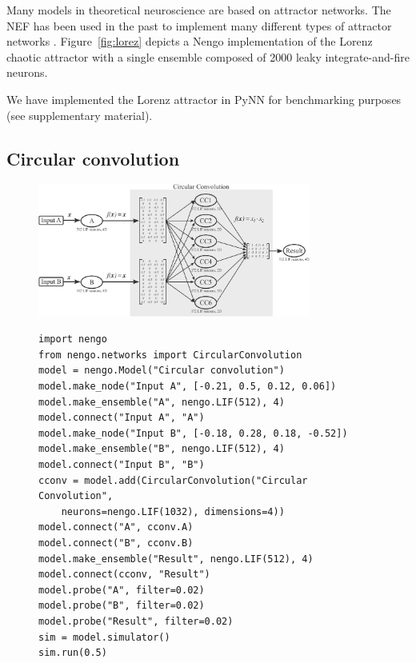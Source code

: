 \documentclass{frontiersSCNS}
\begin{document}
Many models in theoretical neuroscience
are based on attractor networks.
The NEF has been used in the past
to implement many different types of
attractor networks \cite{TODO}.
Figure~\ref{fig:lorez} depicts
a Nengo implementation of the Lorenz chaotic attractor
with a single ensemble
composed of 2000 leaky integrate-and-fire neurons.

We have implemented the Lorenz attractor
in PyNN for benchmarking purposes
(see supplementary material).

\subsection{Circular convolution} \label{sec:cconv}

\begin{figure}
\begin{center}
  \includegraphics[width=0.8\textwidth]{cconv}
  \begin{minipage}{0.46\textwidth}
    \begin{lstlisting}[basicstyle={\footnotesize\ttfamily}]
import nengo
from nengo.networks import CircularConvolution
model = nengo.Model("Circular convolution")
model.make_node("Input A", [-0.21, 0.5, 0.12, 0.06])
model.make_ensemble("A", nengo.LIF(512), 4)
model.connect("Input A", "A")
model.make_node("Input B", [-0.18, 0.28, 0.18, -0.52])
model.make_ensemble("B", nengo.LIF(512), 4)
model.connect("Input B", "B")
cconv = model.add(CircularConvolution("Circular Convolution",
    neurons=nengo.LIF(1032), dimensions=4))
model.connect("A", cconv.A)
model.connect("B", cconv.B)
model.make_ensemble("Result", nengo.LIF(512), 4)
model.connect(cconv, "Result")
model.probe("A", filter=0.02)
model.probe("B", filter=0.02)
model.probe("Result", filter=0.02)
sim = model.simulator()
sim.run(0.5)
    \end{lstlisting}
  \end{minipage}
  \begin{minipage}{0.46\textwidth}

\end{minipage}
\end{center}
\end{figure}
\end{document}
